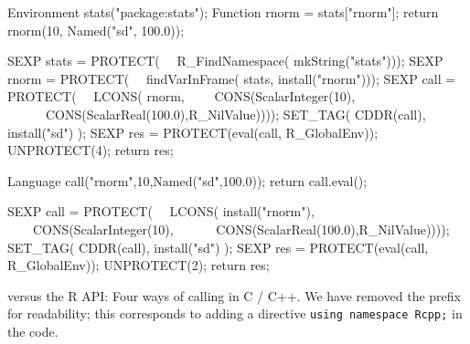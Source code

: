\begin{table*}[t]
  \begin{minipage}[t]{0.465\linewidth}
    \begin{example}
Environment stats("package:stats");
Function rnorm = stats["rnorm"];
return rnorm(10, Named("sd", 100.0));
    \end{example}
  \end{minipage}
  \begin{minipage}{0.06\linewidth}
    \phantom{XXX}
  \end{minipage}
  \begin{minipage}[t]{0.465\linewidth}
    \begin{example}
SEXP stats = PROTECT( 
\ \ R_FindNamespace( mkString("stats")));
SEXP rnorm = PROTECT( 
\ \ findVarInFrame( stats, install("rnorm")));
SEXP call  = PROTECT( 
\ \ LCONS( rnorm, 
\ \ \ \ CONS(ScalarInteger(10), 
\ \ \ \ \ \ CONS(ScalarReal(100.0),R_NilValue))));
SET_TAG( CDDR(call), install("sd") );
SEXP res = PROTECT(eval(call, R_GlobalEnv));
UNPROTECT(4);
return res;
    \end{example}
  \end{minipage}


  \begin{minipage}[t]{0.465\linewidth}
    \begin{example}
Language call("rnorm",10,Named("sd",100.0));
return call.eval();
    \end{example}
  \end{minipage}
  \begin{minipage}{0.06\linewidth}
    \phantom{XXX}
  \end{minipage}
  \begin{minipage}[t]{0.465\linewidth}
    \begin{example}
SEXP call  = PROTECT( 
\ \ LCONS( install("rnorm"), 
\ \ \ \ CONS(ScalarInteger(10), 
\ \ \ \ \ \ CONS(ScalarReal(100.0),R_NilValue))));
SET_TAG( CDDR(call), install("sd") );
SEXP res = PROTECT(eval(call, R_GlobalEnv));
UNPROTECT(2);
return res;
    \end{example}
  \end{minipage}
  \caption{ versus the R API: Four ways of calling  in C / C++. 
  We have removed the  prefix for readability; this corresponds to adding a directive
  \texttt{using namespace Rcpp;} in the code.}
  \label{fig:rnormCode}
\end{table*}

